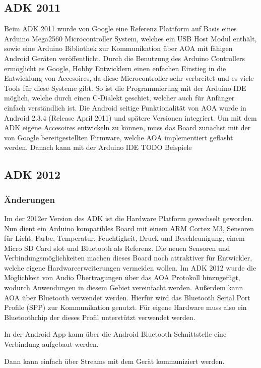 \documentclass[12pt,journal,compsoc]{IEEEtran}
\begin{document}
\subsection{ADK 2011}
Beim ADK 2011 wurde von Google eine
Referenz Plattform auf Basis eines Arduino Mega2560 Microcontroller System, welches ein USB Host Modul enthält, sowie eine Arduino Bibliothek zur Kommunikation über AOA mit fähigen Android Geräten veröffentlicht.
Durch die Benutzung des Arduino Controllers ermöglicht es Google, Hobby Entwicklern einen enfachen Einstieg in die Entwicklung von Accesoires, da diese Microcontroller sehr verbreitet und es viele Tools für diese Systeme gibt.
So ist die Programmierung mit der Arduino IDE möglich, welche durch einen C-Dialekt geschiet, welcher auch für Anfänger einfach verständlich ist.
Die Android seitige Funktionalität von AOA wurde in Android 2.3.4 (Release April 2011) und spätere Versionen integriert. 
Um mit dem ADK eigene Accesoires entwickeln zu können, muss das Board zunächst mit der von Google bereitgestellten Firmware, welche AOA implementiert geflasht werden.
Danach kann mit der Arduino IDE 
TODO Beispiele
\subsection{ADK 2012}
\subsubsection{Änderungen}
Im der 2012er Version des ADK ist die Hardware Platform gewechselt geworden. Nun dient ein Arduino kompatibles Board mit einem ARM Cortex M3, Sensoren für Licht, Farbe, Temperatur, Feuchtigkeit, Druck und Beschleunigung, einem Micro SD Card slot und Bluetooth als Referenz.
Die neuen Sensoren und Verbindungsmöglichkeiten machen dieses Board noch attraktiver für Entwickler, welche eigene Hardwareerweiterungen vermeiden wollen.
Im ADK 2012 wurde die Möglichkeit von Audio Übertragungen über das AOA Protokoll hinzugefügt, wodurch Anwendungen in diesem Gebiet vereinfacht werden.
Außerdem kann AOA über Bluetooth verwendet werden. Hierfür wird das Bluetooth Serial Port Profile (SPP) zur Kommunikation genutzt. Für eigene Hardware muss also ein Bluetoothchip der dieses Profil unterstützt verwendet werden.


In der Android App kann über die Android Bluetooth Schnittstelle eine Verbindung aufgebaut werden.

Dann kann einfach über Streams mit dem Gerät kommuniziert werden.
\end{document}
